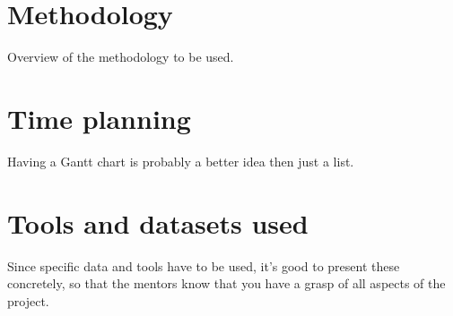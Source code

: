 \section{Methodology}
Overview of the methodology to be used.

\section{Time planning}
Having a Gantt chart is probably a better idea then just a list.

\section{Tools and datasets used}
Since specific data and tools have to be used, it’s good to present these concretely, 
so that the mentors know that you have a grasp of all aspects of the project.
